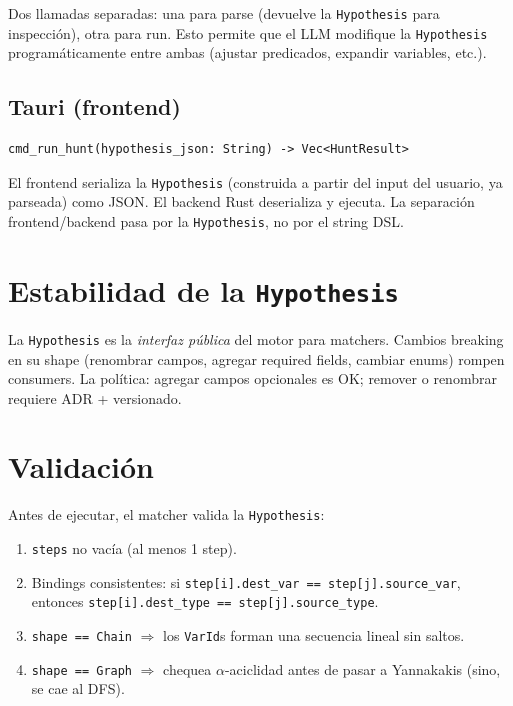 \noindent
Dos llamadas separadas: una para parse (devuelve la
\texttt{Hypothesis} para inspección), otra para run. Esto permite
que el LLM modifique la \texttt{Hypothesis} programáticamente entre
ambas (ajustar predicados, expandir variables, etc.).

\subsection{Tauri (frontend)}

\begin{lstlisting}
cmd_run_hunt(hypothesis_json: String) -> Vec<HuntResult>
\end{lstlisting}

\noindent
El frontend serializa la \texttt{Hypothesis} (construida a partir
del input del usuario, ya parseada) como JSON. El backend Rust
deserializa y ejecuta. La separación frontend/backend pasa por la
\texttt{Hypothesis}, no por el string DSL.

\section{Estabilidad de la \texttt{Hypothesis}}

\begin{advertencia}
La \texttt{Hypothesis} es la \emph{interfaz pública} del motor para
matchers. Cambios breaking en su shape (renombrar campos, agregar
required fields, cambiar enums) rompen consumers. La política:
agregar campos opcionales es OK; remover o renombrar requiere ADR
+ versionado.
\end{advertencia}

\section{Validación}

Antes de ejecutar, el matcher valida la \texttt{Hypothesis}:

\begin{enumerate}
    \item \texttt{steps} no vacía (al menos 1 step).
    \item Bindings consistentes: si \texttt{step[i].dest\_var ==
    step[j].source\_var}, entonces \texttt{step[i].dest\_type ==
    step[j].source\_type}.
    \item \texttt{shape == Chain} $\Rightarrow$ los \texttt{VarId}s
    forman una secuencia lineal sin saltos.
    \item \texttt{shape == Graph} $\Rightarrow$ chequea
    \(\alpha\)-aciclidad antes de pasar a Yannakakis (sino, se
    cae al DFS).
\end{enumerate}

